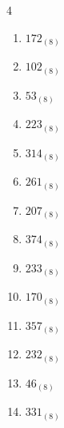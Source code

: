


\setcounter{quesnum}{60}

\begin{multicols}{4}
\begin{enumerate}
  \itemsep=10pt
  \item $172_{(8)}$

        \phantom{$=122$}

  \item $102_{(8)}$

        \phantom{$=66$}

  \item $53_{(8)}$

        \phantom{$=43$}

  \item $223_{(8)}$

        \phantom{$=147$}

  \item $314_{(8)}$

        \phantom{$=204$}

  \item $261_{(8)}$

        \phantom{$=177$}

  \item $207_{(8)}$

        \phantom{$=135$}

  \item $374_{(8)}$

        \phantom{$=252$}

  \item $233_{(8)}$

        \phantom{$=155$}

  \item $170_{(8)}$

        \phantom{$=120$}

  \item $357_{(8)}$

        \phantom{$=239$}

  \item $232_{(8)}$

        \phantom{$=154$}

  \item $46_{(8)}$

        \phantom{$=38$}

  \item $331_{(8)}$

        \phantom{$=217$}


\end{enumerate}
\end{multicols}
